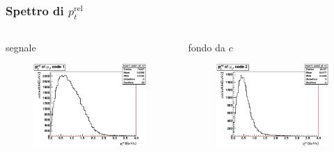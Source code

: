 \documentclass[italian]{beamer}
\newcommand{\ptrel}{\ensuremath{p_{t}^{\text{rel}}}}
\begin{document}
\begin{frame}
    \frametitle{Spettro di \ptrel}
    \begin{columns}
        \begin{column}{.5\textwidth}
            \centering
            segnale
            \begin{figure}[h]
                \centering
                \includegraphics[width=\textwidth]{muon1_code1_pt_rel.eps}
            \end{figure}
        \end{column}
        \begin{column}{.5\textwidth}
            \centering
            fondo da $c$
            \begin{figure}[h]
                \centering
                \includegraphics[width=\textwidth]{muon1_code2_pt_rel.eps}
            \end{figure}
        \end{column}
    \end{columns}
\end{frame}
\end{document}
